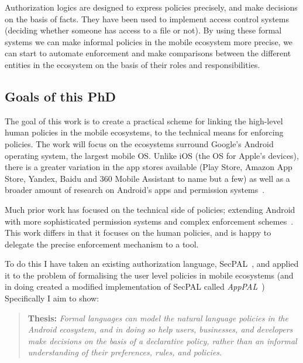 \documentclass[a4paper]{scrartcl}
\begin{document}
Authorization logics are designed to express policies precisely, and make
decisions on the basis of facts. They have been used to implement access control
systems (deciding whether someone has access to a file or not).  By using these
formal systems we can make informal policies in the mobile ecosystem
more precise, we can start to automate enforcement and make comparisons between
the different entities in the ecosystem on the basis of their roles and
responsibilities.

\subsection{Goals of this PhD}

The goal of this work is to create a practical scheme for linking the high-level
human policies in the mobile ecosystems, to the technical means for enforcing
policies.
The work will focus on the ecosystems surround Google's Android operating system, the
largest mobile OS.  Unlike iOS (the OS for Apple's devices), there is a greater
variation in the app stores available (Play Store, Amazon App Store, Yandex,
Baidu and 360 Mobile Assistant to name but a few) as well as a broader amount of research
on Android's apps and permission systems~\cite{felt_android_2012,chaudhuri_language-based_2009,lin_modeling_2014}.

Much prior work has focused on the technical side of policies; extending Android
with more sophisticated permission systems and complex enforcement
schemes~\cite{jeon_dr._2012,armando_android_2015,hornyack_these_2011}. This work
differs in that it focuses on the human policies, and is happy to delegate the
precise enforcement mechanism to a tool.

To do this I have taken an existing authorization language, SecPAL~\cite{becker_secpal:_2010}, and applied
it to the problem of formalising the user level policies in mobile ecosystems
(and in doing created a modified implementation of SecPAL called \emph{AppPAL}~\cite{hallett_apppal_2016})
Specifically I aim to show:

\begin{quote}
  \textbf{Thesis:}\itshape
  Formal languages can model the natural language policies in the Android
  ecosystem, and in doing so help users, businesses, and developers make
  decisions on the basis of a declarative policy, rather than an informal
  understanding of their preferences, rules, and policies.
\end{quote}
\end{document}
